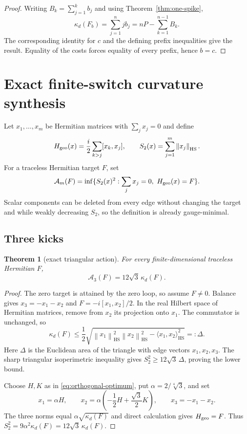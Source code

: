 \documentclass[11pt]{article}
\newtheorem{theorem}{Theorem}[section]
\theoremstyle{definition}
\theoremstyle{remark}
\newcommand{\1}{\mathbf 1}
\newcommand{\norm}[1]{\left\lVert#1\right\rVert}
\newcommand{\HS}{\mathrm{HS}}
\begin{document}
\begin{proof}
Writing $B_k=\sum_{j=1}^k b_j$ and using Theorem~\ref{thm:one-spike},
\[
 \kappa_d(F_b)=\sum_{j=1}^n j b_j
 =nP-\sum_{k=1}^{n-1}B_k.
\]
The corresponding identity for $c$ and the defining prefix inequalities give
the result.  Equality of the costs forces equality of every prefix, hence
$b=c$.
\end{proof}

\section{Exact finite-switch curvature synthesis}

Let $x_1,\ldots,x_m$ be Hermitian matrices with $\sum_jx_j=0$ and define
\begin{equation}
 H_{\rm geo}(x)=\frac i2\sum_{k>j}[x_k,x_j],
 \qquad S_2(x)=\sum_{j=1}^m\norm{x_j}_{\HS}.
 \label{eq:loop}
\end{equation}
For a traceless Hermitian target $F$, set
\begin{equation}
 \mathcal A_m(F)=\inf\{S_2(x)^2:\sum_jx_j=0,\ H_{\rm geo}(x)=F\}.
 \label{eq:action}
\end{equation}
Scalar components can be deleted from every edge without changing the target
and while weakly decreasing $S_2$, so the definition is already
gauge-minimal.

\subsection{Three kicks}

\begin{theorem}[exact triangular action]
\label{thm:three}
For every finite-dimensional traceless Hermitian $F$,
\begin{equation}
 \boxed{\quad \mathcal A_3(F)=12\sqrt3\,\kappa_d(F).\quad}
 \label{eq:three}
\end{equation}
\end{theorem}

\begin{proof}
The zero target is attained by the zero loop, so assume $F\ne0$.  Balance gives $x_3=-x_1-x_2$ and
$F=-i[x_1,x_2]/2$.  In the real Hilbert space of Hermitian matrices, remove
from $x_2$ its projection onto $x_1$.  The commutator is unchanged, so
\[
 \kappa_d(F)\le\frac12
 \sqrt{\norm{x_1}_{\HS}^2\norm{x_2}_{\HS}^2
       -\langle x_1,x_2\rangle_{\HS}^2}=:\Delta.
\]
Here $\Delta$ is the Euclidean area of the triangle with edge vectors
$x_1,x_2,x_3$.  The sharp triangular isoperimetric inequality gives
$S_2^2\ge12\sqrt3\,\Delta$, proving the lower bound.

Choose $H,K$ as in \eqref{eq:orthogonal-optimum}, put
$\alpha=2/\sqrt[4]{3}$, and set
\[
 x_1=\alpha H,\qquad
 x_2=\alpha\left(-\frac12H+\frac{\sqrt3}{2}K\right),\qquad
 x_3=-x_1-x_2.
\]
The three norms equal $\alpha\sqrt{\kappa_d(F)}$ and direct calculation gives
$H_{\rm geo}=F$.  Thus
$S_2^2=9\alpha^2\kappa_d(F)=12\sqrt3\,\kappa_d(F)$.
\end{proof}
\end{document}
